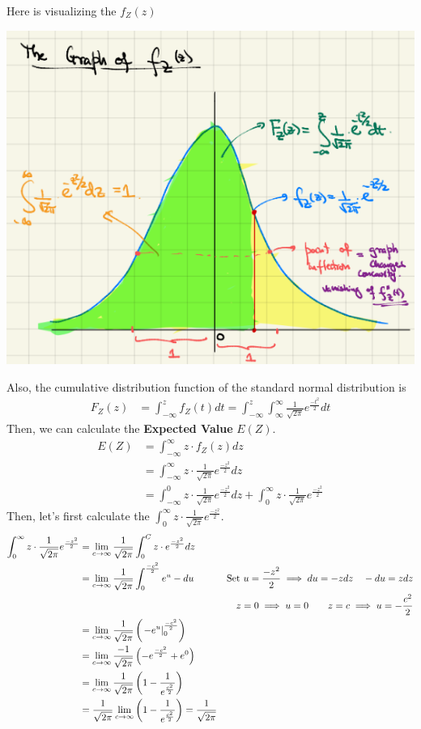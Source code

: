 \documentclass[11pt,oneside]{book}
\theoremstyle{break}
\theoremstyle{break}
\begin{document}
Here is visualizing the $f_Z(z)$
\begin{center}
\includegraphics[scale=0.6]{figures/normal_dis_graph}
\end{center}
Also, the cumulative distribution function of the standard normal distribution is \begin{align*}
F_Z(z)&=\int_{-\infty}^{z}f_Z(t)dt=\int_{-\infty}^{z}\int_{\infty}^{\infty}\frac{1}{\sqrt{2\pi}}e^{\frac{-t^2}{2}}dt
\end{align*}
Then, we can calculate the \textbf{Expected Value} $E(Z)$.\begin{align*}
E(Z)&=\int_{-\infty}^{\infty}z\cdot f_Z(z)dz\\
&=\int_{-\infty}^{\infty}z\cdot \frac{1}{\sqrt{2\pi}}e^{\frac{-z^2}{2}}dz\\
&=\int_{-\infty}^{0}z\cdot \frac{1}{\sqrt{2\pi}}e^{\frac{-z^2}{2}}dz+\int_{0}^{\infty}z\cdot \frac{1}{\sqrt{2\pi}}e^{\frac{-z^2}{2}}
\end{align*}
Then, let's first calculate the $\int_{0}^{\infty}z\cdot \frac{1}{\sqrt{2\pi}}e^{\frac{-z^2}{2}}$.\begin{align*}
\int_{0}^{\infty}z\cdot \frac{1}{\sqrt{2\pi}}e^{\frac{-z^2}{2}}&=\lim_{c\rightarrow \infty}\frac{1}{\sqrt{2\pi}}\int_{0}^{C}z\cdot e^{\frac{-z^2}{2}}dz\\
&=\lim_{c\rightarrow \infty}\frac{1}{\sqrt{2\pi}}\int_{0}^{\frac{-c^2}{2}} e^{u}-du &\text{Set }u=\frac{-z^2}{2}\implies du=-zdz\text{\quad}-du=zdz\\
&&z=0\implies u=0\text{\qquad} z=c\implies u=-\frac{c^2}{2}\\
&=\lim_{c\rightarrow \infty}\frac{1}{\sqrt{2\pi}}\left( \left. -e^u\right|_0^{\frac{-c^2}{2}} \right)\\
&=\lim_{c\rightarrow \infty}\frac{-1}{\sqrt{2\pi}}\left(-e^{\frac{-c^2}{2}}+e^0 \right)\\
&=\lim_{c\rightarrow \infty}\frac{1}{\sqrt{2\pi}}\left(1-\frac{1}{e^{\frac{c^2}{2}}} \right)\\
&=\frac{1}{\sqrt{2\pi}}\lim_{c\rightarrow \infty}\left(1-\frac{1}{e^{\frac{c^2}{2}}} \right)=\frac{1}{\sqrt{2\pi}}
\end{align*}
\end{document}
